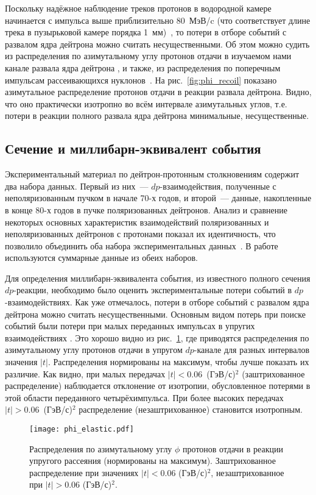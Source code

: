 Поскольку надёжное наблюдение треков протонов в водородной камере начинается с
импульса выше приблизительно 80~МэВ/c (что соответствует длине трека в
пузырьковой камере порядка 1~мм)~\cite{niora91}, то потери в отборе событий с
развалом ядра дейтрона можно считать несущественными. Об этом можно судить из
распределения по азимутальному углу протонов отдачи в изучаемом нами канале
развала ядра дейтрона \dpfrag, и также, из распределения по поперечным импульсам
рассеивающихся нуклонов~\cite{alad75_3}. На рис.~\ref{fig:phi_recoil} показано
азимутальное распределение протонов отдачи в реакции развала дейтрона. Видно,
что оно практически изотропно во всём интервале азимутальных углов, т.е. потери
в реакции полного развала ядра дейтрона минимальные, несущественные.

\subsection{Сечение и миллибарн-эквивалент события}
Экспериментальный материал по дейтрон-протонным столкновениям содержит два
набора данных. Первый из них~--- $dp$-взаимодействия, полученные с
неполяризованным пучком в начале 70-х годов, и второй~--- данные, накопленные в
конце 80-х годов в пучке поляризованных дейтронов. Анализ и сравнение некоторых
основных характеристик взаимодействий поляризованных и неполяризованных
дейтронов с протонами показал их идентичность, что позволило объединить оба
набора экспериментальных данных~\cite{balga88}. В работе используются суммарные
данные из обеих наборов.

Для определения миллибарн-эквивалента события, из известного полного сечения
$dp$-реакции, необходимо было оценить экспериментальные потери событий в
$dp$-взаимодействиях. Как уже отмечалось, потери в отборе событий с развалом
ядра дейтрона можно считать несущественными. Основным видом потерь при поиске
событий были потери при малых переданных импульсах в упругих взаимодействиях
\dpela. Это хорошо видно из рис.~\ref{fig:phi_elastic}, где приводятся
распределения по азимутальному углу протонов отдачи в упругом $dp$-канале для
разных интервалов значения $|t|$. Распределения нормированы на максимум, чтобы
лучше показать их различие. Как видно, при малых передачах
$|t| < 0.06$~(ГэВ/с)$^2$ (заштрихованное распределение) наблюдается отклонение
от изотропии, обусловленное потерями в этой области переданного четырёхимпульса.
При более высоких передачах $|t| > 0.06$~(ГэВ/с)$^2$ распределение
(незаштрихованное) становится изотропным.

\vspace{-0.1cm}
\begin{figure}[h]
  \centering
  \texttt{[image: phi\_elastic.pdf]}
  \caption{Распределения по азимутальному углу $\phi$ протонов отдачи в реакции
    упругого рассеяния \dpela (нормированы на максимум). Заштрихованное
    распределение при значениях $|t| < 0.06$ (ГэВ/с)$^2$, незаштрихованное при
    $|t| > 0.06$ (ГэВ/с)$^2$.}
  \label{fig:phi_elastic}
\end{figure}

